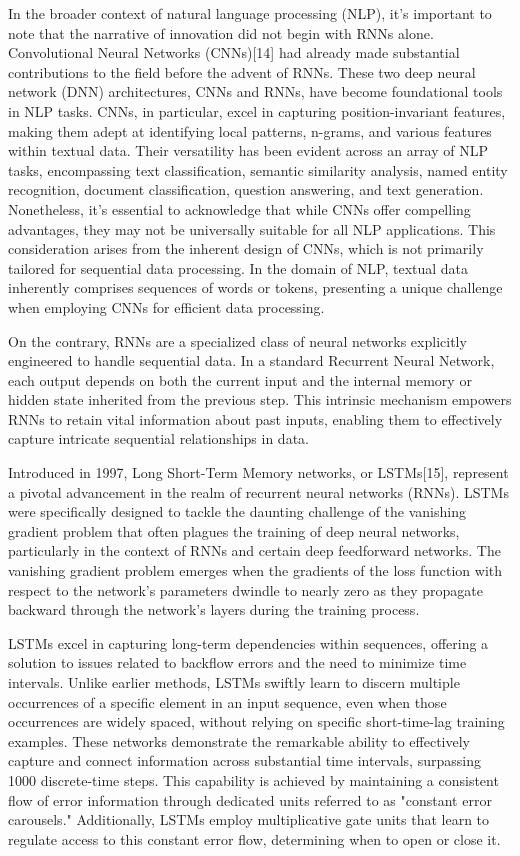 \documentclass[conference]{IEEEtran}
\begin{document}
In the broader context of natural language processing (NLP), it's important to note that the narrative of innovation did not begin with RNNs alone. Convolutional Neural Networks (CNNs)[14] had already made substantial contributions to the field before the advent of RNNs. These two deep neural network (DNN) architectures, CNNs and RNNs, have become foundational tools in NLP tasks. CNNs, in particular, excel in capturing position-invariant features, making them adept at identifying local patterns, n-grams, and various features within textual data. Their versatility has been evident across an array of NLP tasks, encompassing text classification, semantic similarity analysis, named entity recognition, document classification, question answering, and text generation. Nonetheless, it's essential to acknowledge that while CNNs offer compelling advantages, they may not be universally suitable for all NLP applications. This consideration arises from the inherent design of CNNs, which is not primarily tailored for sequential data processing. In the domain of NLP, textual data inherently comprises sequences of words or tokens, presenting a unique challenge when employing CNNs for efficient data processing.


On the contrary, RNNs are a specialized class of neural networks explicitly engineered to handle sequential data. In a standard Recurrent Neural Network, each output depends on both the current input and the internal memory or hidden state inherited from the previous step. This intrinsic mechanism empowers RNNs to retain vital information about past inputs, enabling them to effectively capture intricate sequential relationships in data. 




Introduced in 1997, Long Short-Term Memory networks, or LSTMs[15], represent a pivotal advancement in the realm of recurrent neural networks (RNNs). LSTMs were specifically designed to tackle the daunting challenge of the vanishing gradient problem that often plagues the training of deep neural networks, particularly in the context of RNNs and certain deep feedforward networks. The vanishing gradient problem emerges when the gradients of the loss function with respect to the network's parameters dwindle to nearly zero as they propagate backward through the network's layers during the training process.


LSTMs excel in capturing long-term dependencies within sequences, offering a solution to issues related to backflow errors and the need to minimize time intervals. Unlike earlier methods, LSTMs swiftly learn to discern multiple occurrences of a specific element in an input sequence, even when those occurrences are widely spaced, without relying on specific short-time-lag training examples. These networks demonstrate the remarkable ability to effectively capture and connect information across substantial time intervals, surpassing 1000 discrete-time steps. This capability is achieved by maintaining a consistent flow of error information through dedicated units referred to as "constant error carousels." Additionally, LSTMs employ multiplicative gate units that learn to regulate access to this constant error flow, determining when to open or close it.
\end{document}
